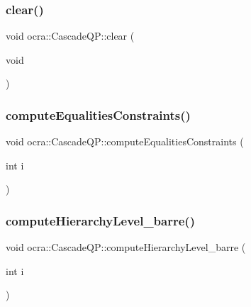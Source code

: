 \hypertarget{classocra_1_1CascadeQP_a476d6af7b355fd8a3887e9708253cd1a}{}\label{classocra_1_1CascadeQP_a476d6af7b355fd8a3887e9708253cd1a} 
\subsubsection{\texorpdfstring{clear()}{clear()}}
{\footnotesize\ttfamily void ocra\+::\+Cascade\+Q\+P\+::clear (\begin{DoxyParamCaption}\item[{void}]{ }\end{DoxyParamCaption})}

\hypertarget{classocra_1_1CascadeQP_af402ea4556f12c7dfbbd6124d01543bb}{}\label{classocra_1_1CascadeQP_af402ea4556f12c7dfbbd6124d01543bb} 
\subsubsection{\texorpdfstring{compute\+Equalities\+Constraints()}{computeEqualitiesConstraints()}}
{\footnotesize\ttfamily void ocra\+::\+Cascade\+Q\+P\+::compute\+Equalities\+Constraints (\begin{DoxyParamCaption}\item[{int}]{i }\end{DoxyParamCaption})\hspace{0.3cm}{\ttfamily [protected]}}

\hypertarget{classocra_1_1CascadeQP_a25feb68d7077bf5a8545313ccfe67edc}{}\label{classocra_1_1CascadeQP_a25feb68d7077bf5a8545313ccfe67edc} 
\subsubsection{\texorpdfstring{compute\+Hierarchy\+Level\+\_\+barre()}{computeHierarchyLevel\_barre()}}
{\footnotesize\ttfamily void ocra\+::\+Cascade\+Q\+P\+::compute\+Hierarchy\+Level\+\_\+barre (\begin{DoxyParamCaption}\item[{int}]{i }\end{DoxyParamCaption})\hspace{0.3cm}{\ttfamily [protected]}}

